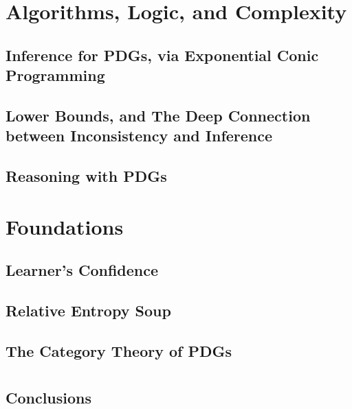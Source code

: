 \documentclass[tocprelim,
    ]{cornellmodified}
\begin{document}
\part{Algorithms, Logic, and Complexity%
    } \label{part:algo-logic-complexity}

\chapter{Inference for PDGs, via Exponential Conic Programming}
    

\chapter[Lower Bounds, and the Deep Connection\texorpdfstring{\\}{}between Inconsistency and Inference]%
    {Lower Bounds, and The Deep Connection between Inconsistency and Inference}
    

\chapter{Reasoning with PDGs}
    


\part{Foundations} \label{part:foundations}

\chapter{Learner's Confidence}
    

\chapter{Relative Entropy Soup}
    

\chapter{The Category Theory of PDGs}
    

\part{}  \label{part:conclusions}
\chapter{Conclusions}
    \label{chap:end}
    


% 
% 

\end{document}
